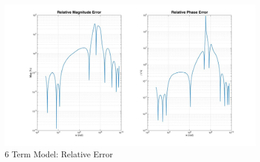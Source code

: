 \begin{figure}[ht!]
\includegraphics[keepaspectratio=true,width=6in]{./figures/regression/fullModel_Rel.jpg}
\centering
\caption{6 Term Model: Relative Error}
\label{fig:fullModel_Rel}
\end{figure}
